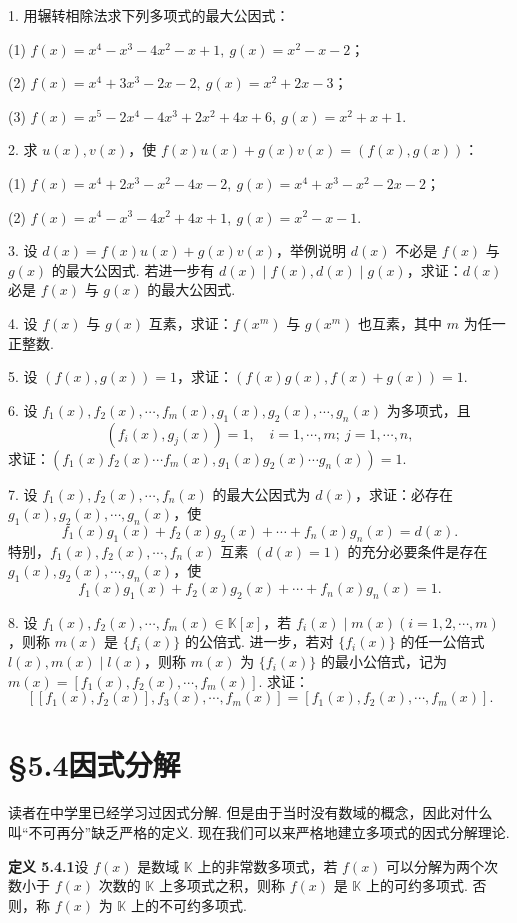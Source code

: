 \documentclass[UTF8,12pt,a4paper,fontset=fandol]{ctexart}
\begin{document}
1. 用辗转相除法求下列多项式的最大公因式：

(1) $f(x)=x^4-x^3-4x^2-x+1,\ g(x)=x^2-x-2$；

(2) $f(x)=x^4+3x^3-2x-2,\ g(x)=x^2+2x-3$；

(3) $f(x)=x^5-2x^4-4x^3+2x^2+4x+6,\ g(x)=x^2+x+1$.

2. 求 $u(x),v(x)$，使 $f(x)u(x)+g(x)v(x)=(f(x),g(x))$：

(1) $f(x)=x^4+2x^3-x^2-4x-2,\ g(x)=x^4+x^3-x^2-2x-2$；

(2) $f(x)=x^4-x^3-4x^2+4x+1,\ g(x)=x^2-x-1$.

3. 设 $d(x)=f(x)u(x)+g(x)v(x)$，举例说明 $d(x)$ 不必是 $f(x)$ 与 $g(x)$ 的最大公因式. 若进一步有 $d(x)\mid f(x),d(x)\mid g(x)$，求证：$d(x)$ 必是 $f(x)$ 与 $g(x)$ 的最大公因式.

4. 设 $f(x)$ 与 $g(x)$ 互素，求证：$f(x^m)$ 与 $g(x^m)$ 也互素，其中 $m$ 为任一正整数.

5. 设 $(f(x),g(x))=1$，求证：$(f(x)g(x),f(x)+g(x))=1$.

6. 设 $f_1(x),f_2(x),\cdots,f_m(x),g_1(x),g_2(x),\cdots,g_n(x)$ 为多项式，且
\[
(f_i(x),g_j(x))=1,\quad i=1,\cdots,m;\ j=1,\cdots,n,
\]
求证：$(f_1(x)f_2(x)\cdots f_m(x),g_1(x)g_2(x)\cdots g_n(x))=1$.

7. 设 $f_1(x),f_2(x),\cdots,f_n(x)$ 的最大公因式为 $d(x)$，求证：必存在 $g_1(x),g_2(x),\cdots,g_n(x)$，使
\[
f_1(x)g_1(x)+f_2(x)g_2(x)+\cdots+f_n(x)g_n(x)=d(x).
\]
特别，$f_1(x),f_2(x),\cdots,f_n(x)$ 互素 $(d(x)=1)$ 的充分必要条件是存在 $g_1(x),g_2(x),\cdots,g_n(x)$，使
\[
f_1(x)g_1(x)+f_2(x)g_2(x)+\cdots+f_n(x)g_n(x)=1.
\]

8. 设 $f_1(x),f_2(x),\cdots,f_m(x)\in\mathbb{K}[x]$，若 $f_i(x)\mid m(x)(i=1,2,\cdots,m)$，则称 $m(x)$ 是 $\{f_i(x)\}$ 的公倍式. 进一步，若对 $\{f_i(x)\}$ 的任一公倍式 $l(x),m(x)\mid l(x)$，则称 $m(x)$ 为 $\{f_i(x)\}$ 的最小公倍式，记为 $m(x)=[f_1(x),f_2(x),\cdots,f_m(x)]$. 求证：
\[
[[f_1(x),f_2(x)],f_3(x),\cdots,f_m(x)]=[f_1(x),f_2(x),\cdots,f_m(x)].
\]

\section*{§5.4\quad 因式分解}

读者在中学里已经学习过因式分解. 但是由于当时没有数域的概念，因此对什么叫“不可再分”缺乏严格的定义. 现在我们可以来严格地建立多项式的因式分解理论.

\noindent\textbf{定义 5.4.1}\quad 设 $f(x)$ 是数域 $\mathbb{K}$ 上的非常数多项式，若 $f(x)$ 可以分解为两个次数小于 $f(x)$ 次数的 $\mathbb{K}$ 上多项式之积，则称 $f(x)$ 是 $\mathbb{K}$ 上的可约多项式. 否则，称 $f(x)$ 为 $\mathbb{K}$ 上的不可约多项式.
\end{document}
